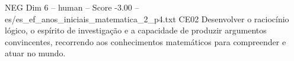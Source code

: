 \begin{textsample}{NEG Dim 6 – human – Score -3.00 – es/es\_ef\_anos\_iniciais\_matematica\_2\_p4.txt}  \label{ex:f6_neg_010}
CE02 Desenvolver o raciocínio lógico, o espírito de investigação e a capacidade de produzir argumentos convincentes, recorrendo aos conhecimentos matemáticos para compreender e atuar no mundo.

\end{textsample}
